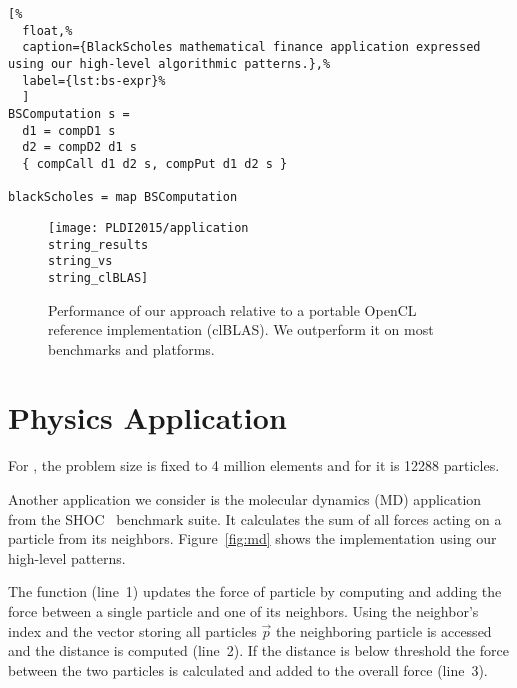 \begin{lstlisting}[%
  float,%
  caption={BlackScholes mathematical finance application expressed using our high-level algorithmic patterns.},%
  label={lst:bs-expr}%
  ]
BSComputation s =
  d1 = compD1 s
  d2 = compD2 d1 s
  { compCall d1 d2 s, compPut d1 d2 s }

blackScholes = map BSComputation
\end{lstlisting}
\begin{figure}[t]
  \texttt{[image: PLDI2015/application\\string\_results\\string\_vs\\string\_clBLAS]} 
  \caption{Performance of our approach relative to a portable OpenCL reference implementation (clBLAS).
           We outperform it on most benchmarks and platforms.}
  \label{fig:clblas}
\end{figure}














\section{Physics Application}

For , the problem size is fixed to 4 million elements and for  it is 12288 particles.


Another application we consider is the molecular dynamics (MD) application from the SHOC~\cite{danalis10shoc} benchmark suite.
It calculates the sum of all forces acting on a particle from its neighbors.
Figure~\ref{fig:md} shows the implementation using our high-level patterns.

The function  (line~1) updates the force  of particle  by computing and adding the force between a single particle and one of its neighbors.
Using the neighbor's index  and the vector storing all particles $\vec{p}$ the neighboring particle is accessed and the distance is computed (line~2).
If the distance is below threshold  the force between the two particles is calculated and added to the overall force  (line~3).



